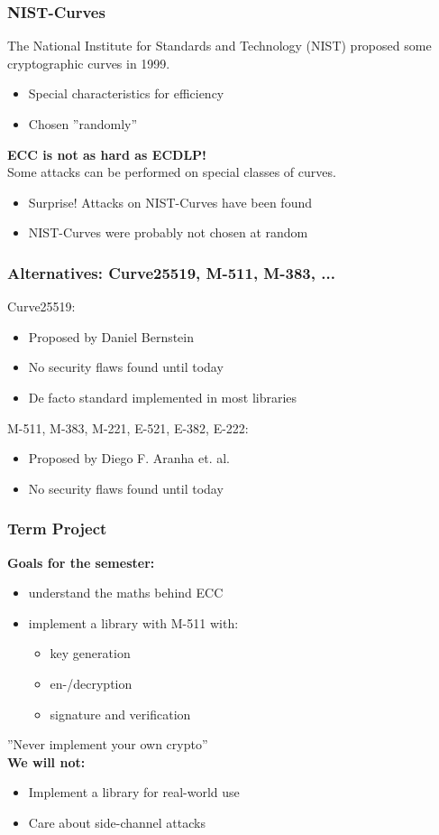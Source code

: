 \documentclass{beamer}
\begin{document}
\begin{frame}
	\frametitle{NIST-Curves}
	The National Institute for Standards and Technology (NIST) proposed some cryptographic curves in 1999.
	\begin{itemize}
		\item Special characteristics for efficiency
		\item Chosen ''randomly''
	\end{itemize}
	\vspace{1cm}
	\textbf{ECC is not as hard as ECDLP!} \\
	Some attacks can be performed on special classes of curves.
	\begin{itemize}
		\item Surprise! Attacks on NIST-Curves have been found
		\item NIST-Curves were probably not chosen at random
	\end{itemize}
	\cite{bernstein2016safecurves}
\end{frame}
\begin{frame}
	\frametitle{Alternatives: Curve25519, M-511, M-383, ...}
	Curve25519:
	\begin{itemize}
		\item Proposed by Daniel Bernstein \cite{bernstein2006curve25519}
		\item No security flaws found until today
		\item De facto standard implemented in most libraries
	\end{itemize}
	\vspace{1cm}
	M-511, M-383, M-221, E-521, E-382, E-222:
	\begin{itemize}
		\item Proposed by Diego F. Aranha et. al. \cite{cryptoeprint:2013:647}
		\item No security flaws found until today
	\end{itemize}
\end{frame}
	\begin{frame}
		\frametitle{Term Project}
		\textbf{Goals for the semester:}
		\begin{itemize}
			\item understand the maths behind ECC
			\item implement a library with M-511 with:
			\begin{itemize}
				\item key generation
				\item en-/decryption
				\item signature and verification
			\end{itemize}
		\end{itemize}
	
		\vspace{0.8cm}
		''Never implement your own crypto'' \\
		\vspace{0.8cm}
		\textbf{We will not:}
		\begin{itemize}
			\item Implement a library for real-world use
			\item Care about side-channel attacks
		\end{itemize}
	\end{frame}
\end{document}
